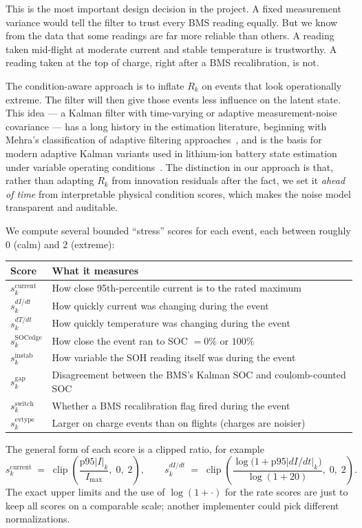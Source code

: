 \documentclass[11pt]{article}
\begin{document}
This is the most important design decision in the project. A fixed
measurement variance would tell the filter to trust every BMS reading
equally. But we know from the data that some readings are far more
reliable than others. A reading taken mid-flight at moderate current
and stable temperature is trustworthy. A reading taken at the top of
charge, right after a BMS recalibration, is not.

The condition-aware approach is to inflate \(R_k\) on events that look
operationally extreme. The filter will then give those events less
influence on the latent state. This idea --- a Kalman filter with
time-varying or adaptive measurement-noise covariance --- has a long
history in the estimation literature, beginning with Mehra's
classification of adaptive filtering approaches~\cite{mehra1972adaptive},
and is the basis for modern adaptive Kalman variants used in lithium-ion
battery state estimation under variable operating
conditions~\cite{yang2021review}. The distinction in our approach is
that, rather than adapting \(R_k\) from innovation residuals after the
fact, we set it \emph{ahead of time} from interpretable physical
condition scores, which makes the noise model transparent and auditable.

We compute several bounded ``stress'' scores for each event, each
between roughly \(0\) (calm) and \(2\) (extreme):
\begin{center}
\begin{tabular}{ll}
\toprule
Score & What it measures \\
\midrule
\(s^{\mathrm{current}}_k\) & How close 95th-percentile current is to the rated maximum \\
\(s^{dI/dt}_k\) & How quickly current was changing during the event \\
\(s^{dT/dt}_k\) & How quickly temperature was changing during the event \\
\(s^{\mathrm{SOCedge}}_k\) & How close the event ran to SOC \(=0\%\) or \(100\%\) \\
\(s^{\mathrm{instab}}_k\) & How variable the SOH reading itself was during the event \\
\(s^{\mathrm{gap}}_k\) & Disagreement between the BMS's Kalman SOC and coulomb-counted SOC \\
\(s^{\mathrm{switch}}_k\) & Whether a BMS recalibration flag fired during the event \\
\(s^{\mathrm{evtype}}_k\) & Larger on charge events than on flights (charges are noisier) \\
\bottomrule
\end{tabular}
\end{center}
The general form of each score is a clipped ratio, for example
\begin{equation}
s^{\mathrm{current}}_k \;=\; \operatorname{clip}\!\left(\frac{\mathrm{p95}|I|_k}{I_{\max}},\; 0,\; 2\right),
\qquad
s^{dI/dt}_k \;=\; \operatorname{clip}\!\left(\frac{\log\!\big(1+\mathrm{p95}|dI/dt|_k\big)}{\log(1+20)},\; 0,\; 2\right).
\end{equation}
The exact upper limits and the use of \(\log(1+\cdot)\) for the rate
scores are just to keep all scores on a comparable scale; another
implementer could pick different normalizations.
\end{document}
